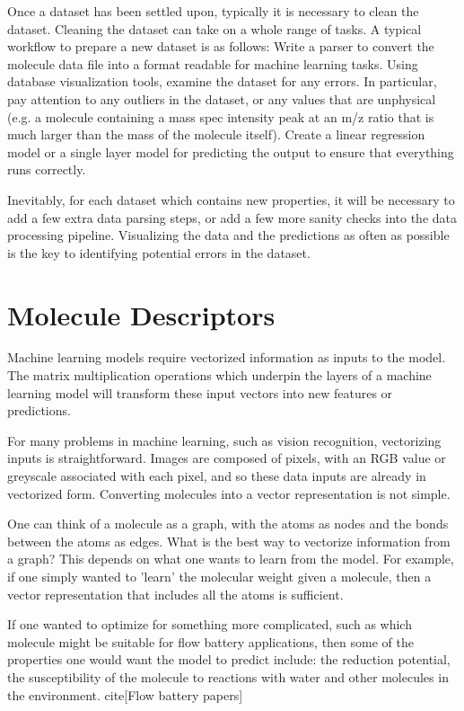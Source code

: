 Once a dataset has been settled upon, typically it is necessary to clean the dataset. Cleaning the dataset can take on a whole range of tasks. A typical workflow to prepare a new dataset is as follows:
Write a parser to convert the molecule data file into a format readable for machine learning tasks.
Using database visualization tools, examine the dataset for any errors. In particular, pay attention to any outliers in the dataset, or any values that are unphysical (e.g. a molecule containing a mass spec intensity peak at an m/z ratio that is much larger than the mass of the molecule itself).
Create a linear regression model or a single layer model for predicting the output to ensure that everything runs correctly.

Inevitably, for each dataset which contains new properties, it will be necessary to add a few extra data parsing steps, or add a few more sanity checks into the data processing pipeline. Visualizing the data and the predictions as often as possible is the key to identifying potential errors in the dataset.

\section{Molecule Descriptors}

Machine learning models require vectorized information as inputs to the model. The matrix multiplication operations which underpin the layers of a machine learning model will transform these input vectors into new features or predictions.

For many problems in machine learning, such as vision recognition, vectorizing inputs is straightforward. Images are composed of pixels, with an RGB value or greyscale associated with each pixel, and so these data inputs are already in vectorized form. Converting molecules into a vector representation is not simple. 

One can think of a molecule as a graph, with the atoms as nodes and the bonds between the atoms as edges. What is the best way to vectorize information from a graph? This depends on what one wants to learn from the model. For example, if one simply wanted to 'learn' the molecular weight given a molecule, then a vector representation that includes all the atoms is sufficient.

If one wanted to optimize for something more complicated, such as which molecule might be suitable for  flow battery applications, then some of the properties one would want the model to predict include: the reduction potential, the susceptibility of the molecule to reactions with water and other molecules in the environment. cite[Flow battery papers]

